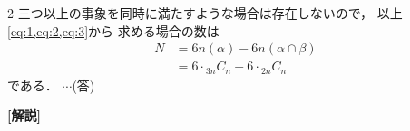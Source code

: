 \documentclass[../../main.tex]{subfiles}
\begin{document}
\begin{multicols}{2}
  三つ以上の事象を同時に満たすような場合は存在しないので，
  以上\cref{eq:1,eq:2,eq:3}から
  求める場合の数は
  \begin{align}
    N
    & = 6 n(\alpha) -6 n(\alpha \cap \beta)    \\
    & =6 \cdot {}_{3n}C_n - 6 \cdot {}_{2n}C_n
  \end{align}
  である． $\cdots$(答)

  {\bf [解説]}

  \newpage
\end{multicols}
\end{document}
